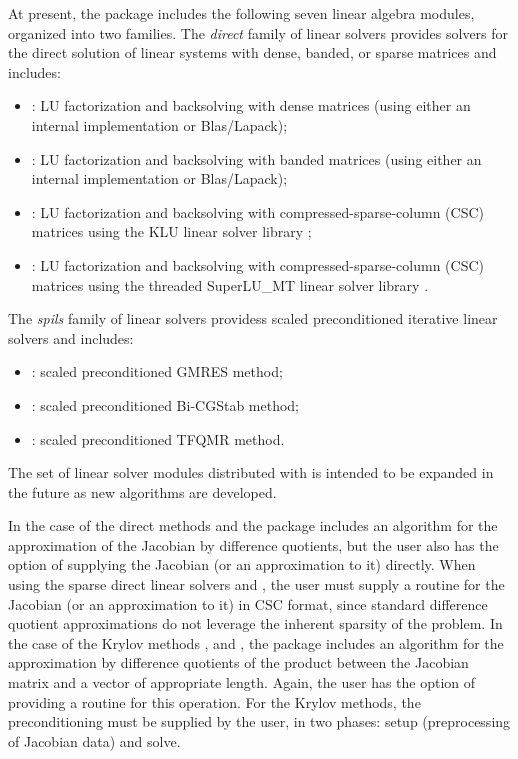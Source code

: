 At present, the package includes the following seven {\kinsol} linear algebra
modules, organized into two families. The {\em direct} family of linear
solvers provides solvers for the direct solution of linear systems with
dense, banded, or sparse matrices and includes:
\begin{itemize} 
\item {\kindense}: LU factorization and backsolving with dense matrices
  (using either an internal implementation or Blas/Lapack); 
\item {\kinband}: LU factorization and backsolving with banded matrices
  (using either an internal implementation or Blas/Lapack); 
\item {\kinklu}: LU factorization and backsolving with
  compressed-sparse-column (CSC) matrices using the KLU linear solver
  library \cite{KLU_site};
\item {\kinsuperlumt}: LU factorization and backsolving with
  compressed-sparse-column (CSC) matrices using the threaded
  SuperLU\_MT linear solver library \cite{SuperLUMT_site}.
\end{itemize}
The {\em spils} family of linear solvers providess scaled preconditioned
iterative linear solvers and includes:
\begin{itemize} 
\item {\kinspgmr}: scaled preconditioned GMRES method;
\item {\kinspbcg}: scaled preconditioned Bi-CGStab method;
\item {\kinsptfqmr}: scaled preconditioned TFQMR method.
\end{itemize}
The set of linear solver modules distributed with {\kinsol} is intended to be expanded in the
future as new algorithms are developed.

In the case of the direct methods {\kindense} and {\kinband} the
package includes an algorithm for the approximation of the Jacobian by
difference quotients, but the user also has the option of supplying
the Jacobian (or an approximation to it) directly.
When using the sparse direct linear solvers {\kinklu} and
{\kinsuperlumt}, the user must supply a routine for the Jacobian (or an
approximation to it) in CSC format, since standard difference quotient
approximations do not leverage the inherent sparsity of the problem.
In the case of the Krylov methods {\kinspgmr}, {\kinspbcg} and {\kinsptfqmr},
the package includes an algorithm for the approximation by difference quotients of the
product between the Jacobian matrix and a vector of appropriate length. Again, the user
has the option of providing a routine for this operation.
For the Krylov methods, 
the preconditioning must be supplied by the user, in two phases:
setup (preprocessing of Jacobian data) and solve.

